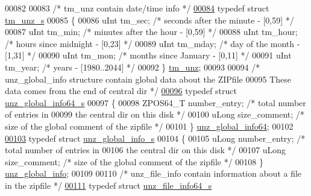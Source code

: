 \begin{DoxyCode}
00082 
00083 \textcolor{comment}{/* tm\_unz contain date/time info */}
\hyperlink{structtm__unz__s}{00084} \textcolor{keyword}{typedef} \textcolor{keyword}{struct }\hyperlink{structtm__unz__s}{tm\_unz\_s}
00085 \{
00086     uInt tm\_sec;            \textcolor{comment}{/* seconds after the minute - [0,59] */}
00087     uInt tm\_min;            \textcolor{comment}{/* minutes after the hour - [0,59] */}
00088     uInt tm\_hour;           \textcolor{comment}{/* hours since midnight - [0,23] */}
00089     uInt tm\_mday;           \textcolor{comment}{/* day of the month - [1,31] */}
00090     uInt tm\_mon;            \textcolor{comment}{/* months since January - [0,11] */}
00091     uInt tm\_year;           \textcolor{comment}{/* years - [1980..2044] */}
00092 \} \hyperlink{structtm__unz__s}{tm\_unz};
00093 
00094 \textcolor{comment}{/* unz\_global\_info structure contain global data about the ZIPfile}
00095 \textcolor{comment}{   These data comes from the end of central dir */}
\hyperlink{structunz__global__info64__s}{00096} \textcolor{keyword}{typedef} \textcolor{keyword}{struct }\hyperlink{structunz__global__info64__s}{unz\_global\_info64\_s}
00097 \{
00098     ZPOS64\_T number\_entry;         \textcolor{comment}{/* total number of entries in}
00099 \textcolor{comment}{                                     the central dir on this disk */}
00100     uLong size\_comment;         \textcolor{comment}{/* size of the global comment of the zipfile */}
00101 \} \hyperlink{structunz__global__info64__s}{unz\_global\_info64};
00102 
\hyperlink{structunz__global__info__s}{00103} \textcolor{keyword}{typedef} \textcolor{keyword}{struct }\hyperlink{structunz__global__info__s}{unz\_global\_info\_s}
00104 \{
00105     uLong number\_entry;         \textcolor{comment}{/* total number of entries in}
00106 \textcolor{comment}{                                     the central dir on this disk */}
00107     uLong size\_comment;         \textcolor{comment}{/* size of the global comment of the zipfile */}
00108 \} \hyperlink{structunz__global__info__s}{unz\_global\_info};
00109 
00110 \textcolor{comment}{/* unz\_file\_info contain information about a file in the zipfile */}
\hyperlink{structunz__file__info64__s}{00111} \textcolor{keyword}{typedef} \textcolor{keyword}{struct }\hyperlink{structunz__file__info64__s}{unz\_file\_info64\_s}

\end{DoxyCode}
